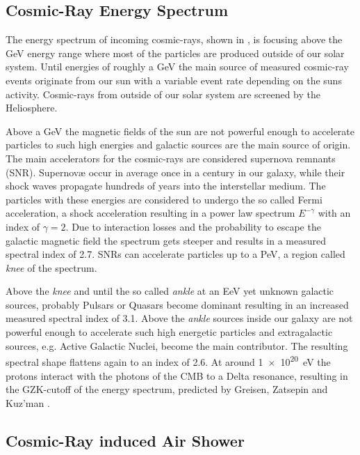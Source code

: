 \subsection{Cosmic-Ray Energy Spectrum}

The energy spectrum of incoming cosmic-rays, shown in , is focusing above the GeV energy range where most of the particles are produced outside of our solar system.
Until energies of roughly a GeV the main source of measured cosmic-ray events originate from our sun with a variable event rate depending on the suns activity.
Cosmic-rays from outside of our solar system are screened by the Heliosphere.

Above a GeV the magnetic fields of the sun are not powerful enough to accelerate particles to such high energies and galactic sources are the main source of origin.
The main accelerators for the cosmic-rays are considered supernova remnants (SNR).
Supernov\ae{} occur in average once in a century in our galaxy, while their shock waves propagate hundreds of years into the interstellar medium.
The particles with these energies are considered to undergo the so called Fermi acceleration, a shock acceleration resulting in a power law spectrum $E^{-\gamma}$ with an index of $\gamma = \num{2}$.
Due to interaction losses and the probability to escape the galactic magnetic field the spectrum gets steeper and results in a measured spectral index of \num{2.7}.
SNRs can accelerate particles up to a PeV, a region called \textit{knee} of the spectrum.

Above the \textit{knee} and until the so called \textit{ankle} at an EeV yet unknown galactic sources, probably Pulsars or Quasars become dominant resulting in an increased measured spectral index of \num{3.1}.
Above the \textit{ankle} sources inside our galaxy are not powerful enough to accelerate such high energetic particles and extragalactic sources, e.g. Active Galactic Nuclei, become the main contributor.
The resulting spectral shape flattens again to an index of \num{2.6}.
At around \SI{1e20}{eV} the protons interact with the photons of the CMB to a Delta resonance, resulting in the GZK-cutoff of the energy spectrum, predicted by Greisen, Zatsepin and Kuz'man \cite{Greisen66GZK, Zatsepin66GZK}.

\subsection{Cosmic-Ray induced Air Shower} \label{sec:air_shower}

